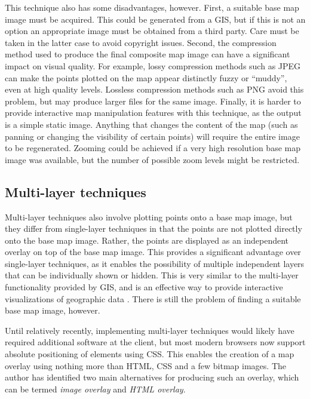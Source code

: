 \documentclass[acmnow]{acmtrans2m}
\begin{document}
This technique also has some disadvantages, however. First, a suitable
base map image must be acquired. This could be generated from a GIS, but
if this is not an option an appropriate image must be obtained from a
third party. Care must be taken in the latter case to avoid copyright
issues. Second, the compression method used to produce the final
composite map image can have a significant impact on visual quality. For
example, lossy compression methods such as JPEG can make the points
plotted on the map appear distinctly fuzzy or ``muddy'',
even at high quality levels. Lossless compression methods such as PNG
avoid this problem, but may produce larger files for the same image.
Finally, it is harder to provide interactive map manipulation features
with this technique, as the output is a simple static image. Anything
that changes the content of the map (such as panning or changing the
visibility of certain points) will require the entire image to be
regenerated. Zooming could be achieved if a very high resolution base
map image was available, but the number of possible zoom levels might be
restricted.




\subsection{Multi-layer techniques}
\label{sec-overlay}

Multi-layer techniques also involve plotting points onto a base map
image, but they differ from single-layer techniques in that the points
are not plotted directly onto the base map image. Rather, the points are
displayed as an independent overlay on top of the base map image. This
provides a significant advantage over single-layer techniques, as it
enables the possibility of multiple independent layers that can be
individually shown or hidden. This is very similar to the multi-layer
functionality provided by GIS, and is an effective way to provide
interactive visualizations of geographic data
\cite{Wood-J-1996-vis,MacE-AM-1998-GIS}. There is still the problem of
finding a suitable base map image, however.

Until relatively recently, implementing multi-layer techniques would
likely have required additional software at the client, but most modern
browsers now support absolute positioning of elements using CSS. This
enables the creation of a map overlay using nothing more than HTML, CSS
and a few bitmap images. The author has identified two main alternatives
for producing such an overlay, which can be termed \emph{image overlay}
and \emph{HTML overlay}.
\end{document}

